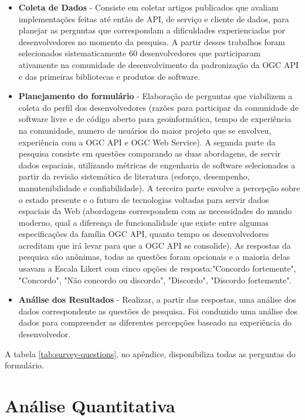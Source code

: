 \begin{itemize}
    \item \textbf{Coleta de Dados} - Consiste em coletar artigos publicados que avaliam implementações feitas até então de API, de serviço e cliente de dados, para planejar as perguntas que correspondam a dificuldades experienciadas por desenvolvedores no momento da pesquisa. A partir desses trabalhos foram selecionados sistematicamente 60 desenvolvedores que participaram ativamente na comunidade de desenvolvimento da padronização da OGC API e das primeiras bibliotecas e produtos de software.
    \item \textbf{Planejamento do formulário} - Elaboração de perguntas que viabilizem a coleta do perfil dos desenvolvedores (razões para participar da comunidade de software livre e de código aberto para geoinformática, tempo de experiência na comunidade, numero de usuários do maior projeto que se envolveu, experiência com a OGC API e OGC Web Service). A segunda parte da pesquisa consiste em questões comparando as duas abordagens, de servir dados espaciais, utilizando métricas de engenharia de software selecionados a partir da revisão sistemática de literatura (esforço, desempenho, manutenibilidade e confiabilidade). A terceira parte envolve a percepção sobre o estado presente e o futuro de tecnologias voltadas para servir dados espaciais da Web (abordagens correspondem com as necessidades do mundo moderno, qual a diferença de funcionalidade que existe entre algumas especificações da família OGC API, quanto tempo os desenvolvedores acreditam que irá levar para que a OGC API se consolide). As respostas da pesquisa são anônimas, todas as questões foram opcionais e a maioria delas usavam a Escala Likert com cinco opções de resposta:"Concordo fortemente", "Concordo", "Não concordo ou discordo", "Discordo", "Discordo fortemente". 
    \item \textbf{Análise dos Resultados} - Realizar, a partir das respostas, uma análise dos dados correspondente as questões de pesquisa. Foi conduzido uma análise dos dados para compreender as diferentes percepções baseado na experiência do desenvolvedor.
\end{itemize}

A tabela \ref{tab:survey-questions}, no apêndice, disponibiliza todas as perguntas do formulário.

\section{Análise Quantitativa}

